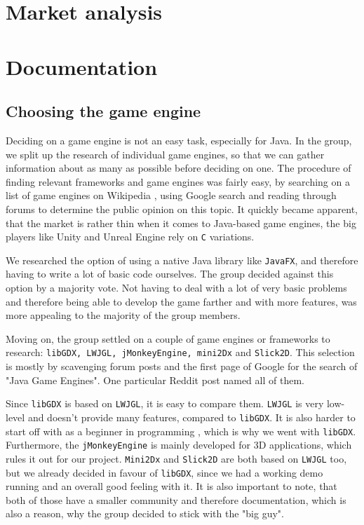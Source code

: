 \documentclass[12p]{article}
\begin{document}
\newpage
\section{Market analysis} \label{MarketAnalysis}


\newpage
\section{Documentation}

\subsection{Choosing the game engine}

Deciding on a game engine is not an easy task, especially for Java. In the group, we split up the research of individual game engines, so that we can gather information about as many as possible before deciding on one. The procedure of finding relevant frameworks and game engines was fairly easy, by searching on a list of game engines on Wikipedia \cite{ListOfGameEngines}, using Google search and reading through forums to determine the public opinion on this topic. It quickly became apparent, that the market is rather thin when it comes to Java-based game engines, the big players like Unity and Unreal Engine rely on \texttt{C} variations.

We researched the option of using a native Java library like \texttt{JavaFX}, and therefore having to write a lot of basic code ourselves. The group decided against this option by a majority vote. Not having to deal with a lot of very basic problems and therefore being able to develop the game farther and with more features, was more appealing to the majority of the group members.

Moving on, the group settled on a couple of game engines or frameworks to research: \texttt{libGDX, LWJGL, jMonkeyEngine, mini2Dx} and \texttt{Slick2D}. This selection is mostly by scavenging forum posts and the first page of Google for the search of "Java Game Engines". One particular Reddit post \cite{RedditJavaGameEngines} named all of them.

Since \texttt{libGDX} is based on \texttt{LWJGL}, it is easy to compare them. \texttt{LWJGL} is very low-level and doesn't provide many features, compared to \texttt{libGDX}. It is also harder to start off with as a beginner in programming \cite{StackExchangeLibGDXLWJGL}, which is why we went with \texttt{libGDX}. Furthermore, the \texttt{jMonkeyEngine} is mainly developed for 3D applications, which rules it out for our project. \texttt{Mini2Dx} and \texttt{Slick2D} are both based on \texttt{LWJGL} too, but we already decided in favour of \texttt{libGDX}, since we had a working demo running and an overall good feeling with it. It is also important to note, that both of those have a smaller community and therefore documentation, which is also a reason, why the group decided to stick with the "big guy". 
\end{document}
